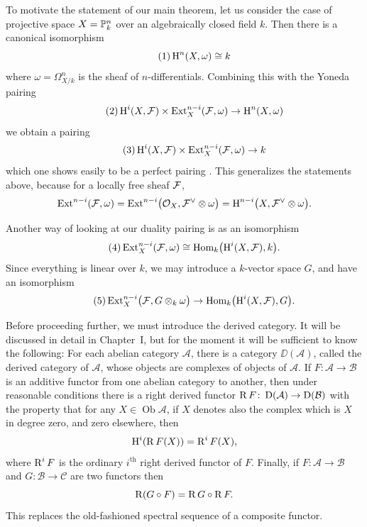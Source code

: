 To motivate the statement of our main theorem, let us consider the case of projective space $X=\mathbb{P}_{k}^{n}$ over an algebraically closed field $k$. Then there is a canonical isomorphism
\begin{equation}\tag{1}\label{eq:1}
	\operatorname{H}^{n}(X, \omega)\cong k
\end{equation}
where $\omega=\Omega_{X/k}^{n}$ is the sheaf of $n$-differentials. Combining this with the Yoneda pairing
\begin{equation}\tag{2}\label{eq:2}
	\operatorname{H}^{i}(X, \mathcal{F})\times \operatorname{Ext}_{X}^{n-i}(\mathcal{F},\omega)\to \operatorname{H}^{n}(X,\omega)
\end{equation}
we obtain a pairing
\begin{equation}\tag{3}\label{eq:3}
	\operatorname{H}^{i}(X, \mathcal{F})\times \operatorname{Ext}_{X}^{n-i}(\mathcal{F},\omega)\to k
\end{equation}
which one shows easily to be a perfect pairing \cite[, expos\'e~12]{SGA}. This generalizes the statements above, because for a locally free sheaf $\mathcal{F}$,
\[
\operatorname{Ext}^{n-i}(\mathcal{F},\omega)=\operatorname{Ext}^{n-i}\bigl(\mathcal{O}_{X},\mathcal{F}^{\vee}\otimes\omega\bigr)=\operatorname{H}^{n-i}\bigl(X,\mathcal{F}^{\vee}\otimes\omega\bigr).
\]

Another way of looking at our duality pairing is as an isomorphism
\begin{equation}\tag{4}\label{eq:4}
	\operatorname{Ext}_{X}^{n-i}(\mathcal{F},\omega)\cong \operatorname{Hom}_{k}\bigl(\operatorname{H}^{i}(X,\mathcal{F}),k\bigr).
\end{equation}
Since everything is linear over $k$, we may introduce a $k$-vector space $G$, and have an isomorphism
\begin{equation}\tag{5}\label{eq:5}
	\operatorname{Ext}_{X}^{n-i}\bigl(\mathcal{F},G\otimes_{k}\omega\bigr)\to \operatorname{Hom}_{k}\bigl(\operatorname{H}^{i}(X,\mathcal{F}),G\bigr).
\end{equation}

Before proceeding further, we must introduce the derived category. It will be discussed in detail in Chapter~I, but for the moment it will be sufficient to know the following: For each abelian category $\mathcal{A}$, there is a category $\DD(\mathcal{A})$, called the derived category of $\mathcal{A}$, whose objects are complexes of objects of $\mathcal{A}$. If $F\colon\mathcal{A}\to\mathcal{B}$ is an additive functor from one abelian category to another, then under reasonable conditions there is a right derived functor $\operatorname{R} F\colon \operatorname{D}(\mathcal{A})\to \operatorname{D}(\mathcal{B})$ with the property that for any $X\in\operatorname{Ob}\mathcal{A}$, if $X$ denotes also the complex which is $X$ in degree zero, and zero elsewhere, then
\[
\operatorname{H}^{i}(\operatorname{R} F(X))=\operatorname{R}^{i}F(X),
\]
where $\operatorname{R}^{i}F$ is the ordinary $i^{\text{th}}$ right derived functor of $F$. Finally, if $F\colon\mathcal{A}\to\mathcal{B}$ and $G\colon\mathcal{B}\to\mathcal{C}$ are two functors then
\[
\operatorname{R}(G\circ F)=\operatorname{R} G\circ \operatorname{R} F.
\]
This replaces the old-fashioned spectral sequence of a composite functor.

